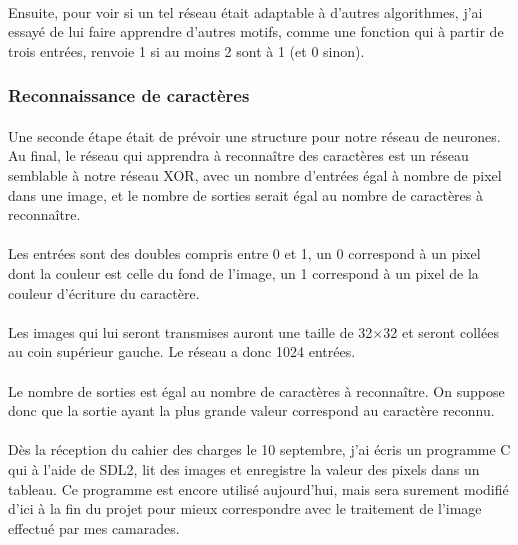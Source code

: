 \documentclass{article}
\begin{document}
\paragraph{}Ensuite, pour voir si un tel réseau était adaptable à d'autres algorithmes, j'ai essayé de lui faire apprendre d'autres motifs, comme une fonction qui à partir de trois entrées, renvoie 1 si au moins 2 sont à 1 (et 0 sinon).

\subsubsection{Reconnaissance de caractères}

\paragraph{}Une seconde étape était de prévoir une structure pour notre réseau de neurones.
Au final, le réseau qui apprendra à reconnaître des caractères est un réseau semblable à notre réseau XOR, avec un nombre d'entrées égal à nombre de pixel dans une image, et le nombre de sorties serait égal au nombre de caractères à reconnaître.

\paragraph{}Les entrées sont des doubles compris entre 0 et 1, un 0 correspond à un pixel dont la couleur est celle du fond de l'image, un 1 correspond à un pixel de la couleur d'écriture du caractère.

\paragraph{}Les images qui lui seront transmises auront une taille de 32$\times$32 et seront collées au coin supérieur gauche. Le réseau a donc 1024 entrées.

\paragraph{}Le nombre de sorties est égal au nombre de caractères à reconnaître. On suppose donc que la sortie ayant la plus grande valeur correspond au caractère reconnu.

\paragraph{} Dès la réception du cahier des charges le 10 septembre, j'ai écris un programme C qui à l'aide de SDL2, lit des images et enregistre la valeur des pixels dans un tableau. Ce programme est encore utilisé aujourd'hui, mais sera surement modifié d'ici à la fin du projet pour mieux correspondre avec le traitement de l'image effectué par mes camarades.
\end{document}
